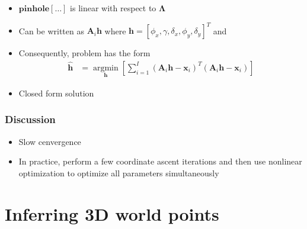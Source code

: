 \documentclass{beamer}
\begin{document}
\begin{frame}
  \begin{itemize}[<+->]
    \item $\mathbf{pinhole}[\ldots]$ is linear with respect to
      $\boldsymbol{\Lambda}$
    \item Can be written as $\mathbf{A}_i\mathbf{h}$ where
      $\mathbf{h}=[\phi_x,\gamma,\delta_x,\phi_y,\delta_y]^T$ and
  \end{itemize}
  \begin{itemize}
    \item<3-> Consequently, problem has the form
      \begin{align*}
        \mathbf{\hat{h}} &=
        \underset{\mathbf{h}}
    {\operatorname{argmin}} \left[
      \sum_{i=1}^I
      \left(\mathbf{A}_i\mathbf{h}-\mathbf{x}_i
      \right)^T
      \left(\mathbf{A}_i\mathbf{h}-\mathbf{x}_i
      \right)
  \right]
      \end{align*}
    \item<4-> Closed form solution
  \end{itemize}
\end{frame}

\begin{frame}
  \frametitle{Discussion}
  \begin{itemize}[<+->]
    \item Slow cenvergence
    \item In practice, perform a few coordinate ascent iterations and
        then use nonlinear optimization to optimize all parameters          simultaneously
  \end{itemize}
\end{frame}

\section{Inferring 3D world points}
\end{document}
